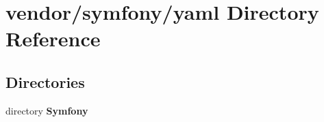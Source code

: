 \section{vendor/symfony/yaml Directory Reference}
\label{dir_c01a5c8bf9850faf959ca01c5581dc36}
\subsection*{Directories}
\begin{DoxyCompactItemize}
\item 
directory {\bf Symfony}
\end{DoxyCompactItemize}
